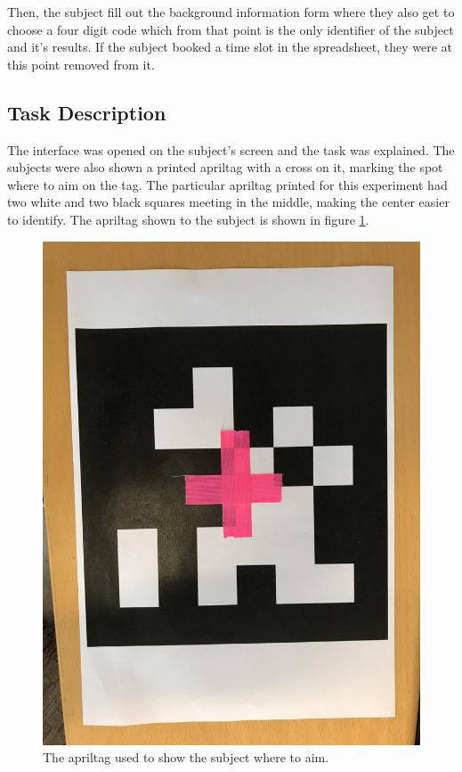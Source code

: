 \documentclass[nofilelist]{cslthse-msc}
\begin{document}
Then, the subject fill out the background information form where they also get to choose a four digit code which from that point is the only identifier of the subject and it's results. If the subject booked a time slot in the spreadsheet, they were at this point removed from it.

\subsection{Task Description}
The interface was opened on the subject's screen and the task was explained. The subjects were also shown a printed apriltag with a cross on it, marking the spot where to aim on the tag. The particular apriltag printed for this experiment had two white and two black squares meeting in the middle, making the center easier to identify. The apriltag shown to the subject is shown in figure \ref{fig:apriltag}.

\begin{figure}[!hbt]
   \centering
   \includegraphics[scale=0.08]{images/apriltag.jpg} 
   \caption{The apriltag used to show the subject where to aim.}
   \label{fig:apriltag}
\end{figure}
\end{document}
